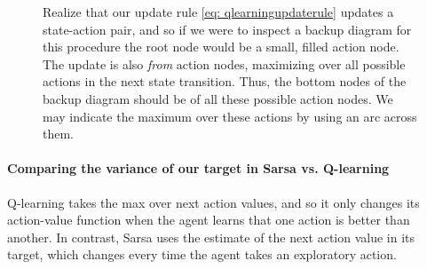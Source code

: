 \documentclass[12pt]{article}
\begin{document}
\begin{figure}[h]
  \centering
  \caption{\footnotesize Realize that our update rule \ref{eq: qlearningupdaterule} updates a state-action pair, and so if we were to inspect a backup diagram for this procedure the root node would be a small, filled action node. The update is also \emph{from} action nodes, maximizing over all possible actions in the next state transition. Thus, the bottom nodes of the backup diagram should be of all these possible action nodes. We may indicate the maximum over these actions by using an arc across them.}
\end{figure}

\paragraph{Comparing the variance of our target in Sarsa vs. Q-learning}
Q-learning takes the max over next action values, and so it only changes its action-value function when the agent learns that one action is better than another. In contrast, Sarsa uses the estimate of the next action value in its target, which changes every time the agent takes an exploratory action.
\end{document}
